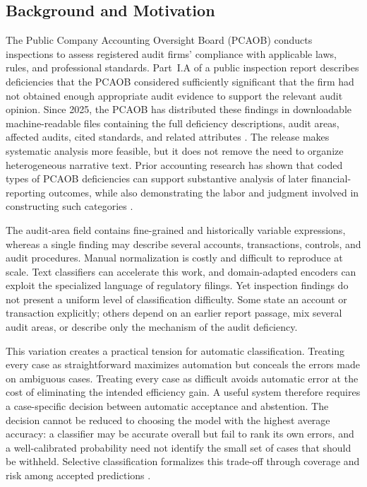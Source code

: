 \documentclass[11pt]{article}
\begin{document}
\subsection{Background and Motivation}

The Public Company Accounting Oversight Board (PCAOB) conducts inspections to
assess registered audit firms' compliance with applicable laws, rules, and
professional standards. Part~I.A of a public inspection report describes
deficiencies that the PCAOB considered sufficiently significant that the firm
had not obtained enough appropriate audit evidence to support the relevant audit
opinion. Since 2025, the PCAOB has distributed these findings in downloadable
machine-readable files containing the full deficiency descriptions, audit areas,
affected audits, cited standards, and related attributes
\cite{pcaob2025datasets}. The release makes systematic analysis more feasible,
but it does not remove the need to organize heterogeneous narrative text.
Prior accounting research has shown that coded types of PCAOB deficiencies can
support substantive analysis of later financial-reporting outcomes, while also
demonstrating the labor and judgment involved in constructing such categories
\cite{constance2025pcaob}.

The audit-area field contains fine-grained and historically variable expressions,
whereas a single finding may describe several accounts, transactions, controls,
and audit procedures. Manual normalization is costly and difficult to reproduce
at scale. Text classifiers can accelerate this work, and domain-adapted encoders
can exploit the specialized language of regulatory filings. Yet inspection
findings do not present a uniform level of classification difficulty. Some state
an account or transaction explicitly; others depend on an earlier report passage,
mix several audit areas, or describe only the mechanism of the audit deficiency.

This variation creates a practical tension for automatic classification.
Treating every case as straightforward maximizes automation
but conceals the errors made on ambiguous cases. Treating every case as difficult
avoids automatic error at the cost of eliminating the intended efficiency gain.
A useful system therefore requires a case-specific decision between automatic
acceptance and abstention. The decision cannot be reduced to choosing the model
with the highest average accuracy: a classifier may be accurate overall but fail
to rank its own errors, and a well-calibrated probability need not identify the
small set of cases that should be withheld. Selective classification formalizes
this trade-off through coverage and risk among accepted predictions
\cite{geifman2017selective}.
\end{document}
